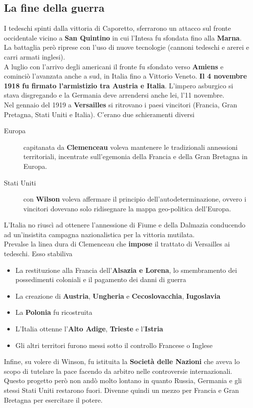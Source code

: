 \subsection{La fine della guerra}
I tedeschi spinti dalla vittoria di Caporetto, sferrarono un attacco sul fronte occidentale vicino a
\textbf{San Quintino} in cui l'Intesa fu sfondata fino alla \textbf{Marna}. La battaglia però
riprese con l'uso di nuove tecnologie (cannoni tedeschi e arerei e carri armati inglesi).\\
A luglio con l'arrivo degli americani il fronte fu sfondato verso \textbf{Amiens} e cominciò 
l'avanzata anche a sud, in Italia fino a Vittorio Veneto. \textbf{Il 4 novembre 1918 fu firmato
l'armistizio tra Austria e Italia}. L'impero asburgico si stava disgregando e la Germania deve
arrendersi anche lei, l'11 novembre.\\ [\baselineskip]
Nel gennaio del 1919 a \textbf{Versailles} si ritrovano i paesi vincitori (Francia, Gran Pretagna,
Stati Uniti e Italia). C'erano due schieramenti diversi
\begin{description}
  \item[Europa] capitanata da \textbf{Clemenceau} voleva mantenere le tradizionali annessioni
    territoriali, incentrate sull'egemonia della Francia e della Gran Bretagna in Europa.
  \item[Stati Uniti] con \textbf{Wilson} voleva affermare il principio dell'autodeterminazione,
    ovvero i vincitori dovevano solo ridisegnare la mappa geo-politica dell'Europa.
\end{description}
L'Italia no riuscì ad ottenere l'annessione di Fiume e della Dalmazia conducendo ad un'insistita
campagna nazionalistica per la vittoria mutilata.\\ [\baselineskip]
Prevalse la linea dura di Clemenceau che \textbf{impose} il trattato di Versailles ai tedeschi.
Esso stabiliva
\begin{itemize}
  \item La restituzione alla Francia dell'\textbf{Alsazia e Lorena}, lo smembramento dei possedimenti
    coloniali e il pagamento dei danni di guerra
  \item La creazione di \textbf{Austria}, \textbf{Ungheria} e \textbf{Cecoslovacchia}, 
    \textbf{Iugoslavia}
  \item La \textbf{Polonia} fu ricostruita
  \item L'Italia ottenne l'\textbf{Alto Adige}, \textbf{Trieste} e l'\textbf{Istria} 
  \item Gli altri territori furono messi sotto il controllo Francese o Inglese
\end{itemize}
Infine, su volere di Winson, fu istituita la \textbf{Società delle Nazioni} che aveva lo scopo di 
tutelare la pace facendo da arbitro nelle controversie internazionali. Questo progetto però
non andò molto lontano in quanto Russia, Germania e gli stessi Stati Uniti restarono fuori. Divenne
quindi un mezzo per Francia e Gran Bretagna per esercitare il potere.

